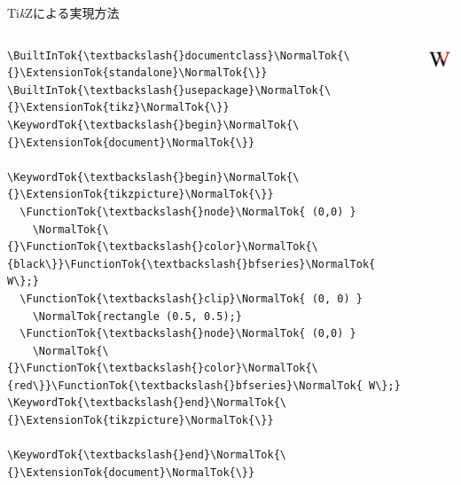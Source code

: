\documentclass[unicode,14pt]{beamer}
\newcommand{\TikZ}{Ti\textit{k}Z}
\begin{document}
\begin{frame}[fragile]{\TikZ{}による実現方法}
  \sffamily
  \vspace*{-\baselineskip}
  \begin{columns}[t]
    \begin{column}{.55\textwidth}
  \begin{tcolorbox}
  \begin{Verbatim}[commandchars=\\\{\}, breaklines=true, breakanywhere=true]
\BuiltInTok{\textbackslash{}documentclass}\NormalTok{\{}\ExtensionTok{standalone}\NormalTok{\}}
\BuiltInTok{\textbackslash{}usepackage}\NormalTok{\{}\ExtensionTok{tikz}\NormalTok{\}}
\KeywordTok{\textbackslash{}begin}\NormalTok{\{}\ExtensionTok{document}\NormalTok{\}}

\KeywordTok{\textbackslash{}begin}\NormalTok{\{}\ExtensionTok{tikzpicture}\NormalTok{\}}
  \FunctionTok{\textbackslash{}node}\NormalTok{ (0,0) }
    \NormalTok{\{}\FunctionTok{\textbackslash{}color}\NormalTok{\{black\}}\FunctionTok{\textbackslash{}bfseries}\NormalTok{ W\};}
  \FunctionTok{\textbackslash{}clip}\NormalTok{ (0, 0) }
    \NormalTok{rectangle (0.5, 0.5);}
  \FunctionTok{\textbackslash{}node}\NormalTok{ (0,0) }
    \NormalTok{\{}\FunctionTok{\textbackslash{}color}\NormalTok{\{red\}}\FunctionTok{\textbackslash{}bfseries}\NormalTok{ W\};}
\KeywordTok{\textbackslash{}end}\NormalTok{\{}\ExtensionTok{tikzpicture}\NormalTok{\}}

\KeywordTok{\textbackslash{}end}\NormalTok{\{}\ExtensionTok{document}\NormalTok{\}}
  \end{Verbatim}
  \end{tcolorbox}
    \end{column}
    \begin{column}{.45\textwidth}
  \begin{center}
    \mbox{}
    \vfill
    \includegraphics[width=.85\textwidth]{figures/wclip.pdf}
    \vfill
  \end{center}
    \end{column}
  \end{columns}
\end{frame}
\end{document}
